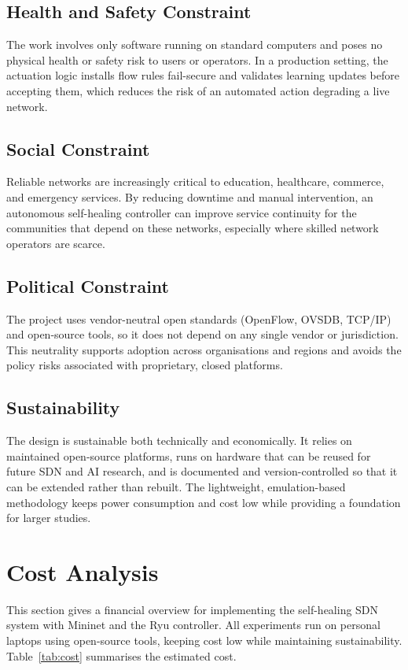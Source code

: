 \documentclass[12pt,a4paper]{report}
\begin{document}
\subsection{Health and Safety Constraint}
The work involves only software running on standard computers and poses no physical health or
safety risk to users or operators. In a production setting, the actuation logic installs
flow rules fail-secure and validates learning updates before accepting them, which reduces
the risk of an automated action degrading a live network.

\subsection{Social Constraint}
Reliable networks are increasingly critical to education, healthcare, commerce, and emergency
services. By reducing downtime and manual intervention, an autonomous self-healing controller
can improve service continuity for the communities that depend on these networks, especially
where skilled network operators are scarce.

\subsection{Political Constraint}
The project uses vendor-neutral open standards (OpenFlow, OVSDB, TCP/IP) and open-source
tools, so it does not depend on any single vendor or jurisdiction. This neutrality supports
adoption across organisations and regions and avoids the policy risks associated with
proprietary, closed platforms.

\subsection{Sustainability}
The design is sustainable both technically and economically. It relies on maintained
open-source platforms, runs on hardware that can be reused for future SDN and AI research,
and is documented and version-controlled so that it can be extended rather than rebuilt.
The lightweight, emulation-based methodology keeps power consumption and cost low while
providing a foundation for larger studies.

\section{Cost Analysis}
\label{sec:cost}
This section gives a financial overview for implementing the self-healing SDN system with
Mininet and the Ryu controller. All experiments run on personal laptops using open-source
tools, keeping cost low while maintaining sustainability. Table~\ref{tab:cost} summarises the
estimated cost.
\end{document}

